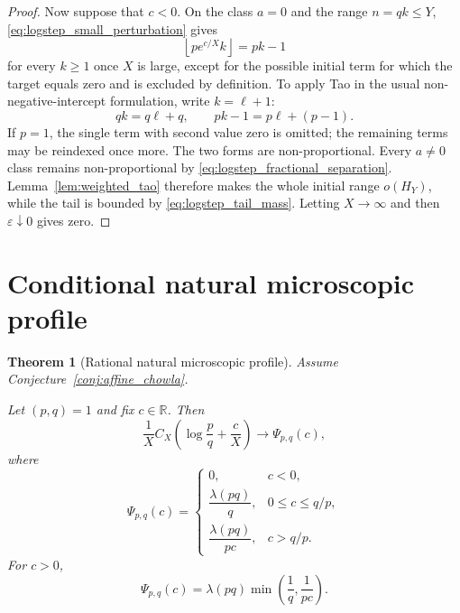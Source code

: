 \documentclass[preprint,12pt]{elsarticle}
\numberwithin{equation}{section}
\theoremstyle{plain}
\newtheorem{theorem}{Theorem}[section]
\theoremstyle{definition}
\theoremstyle{remark}
\begin{document}
\begin{proof}
Now suppose that $c<0$. On the class $a=0$ and the range $n=qk\le Y$,
\eqref{eq:logstep_small_perturbation} gives
\begin{equation}
\left\lfloor pe^{c/X}k\right\rfloor=pk-1
\label{eq:logstep_negative_zero_class}
\end{equation}
for every $k\ge1$ once $X$ is large, except for the possible initial term
for which the target equals zero and is excluded by definition. To apply
Tao in the usual non-negative-intercept formulation, write $k=\ell+1$:
\begin{equation}
qk=q\ell+q,\qquad pk-1=p\ell+(p-1).
\label{eq:logstep_reindex}
\end{equation}
If $p=1$, the single term with second value zero is omitted; the remaining
terms may be reindexed once more. The two forms are non-proportional. Every
$a\ne0$ class remains non-proportional by
\eqref{eq:logstep_fractional_separation}. Lemma~\ref{lem:weighted_tao}
therefore makes the whole initial range $o(H_Y)$, while the tail is bounded
by \eqref{eq:logstep_tail_mass}. Letting $X\to\infty$ and then
$\varepsilon\downarrow0$ gives zero.
\end{proof}

\section{Conditional natural microscopic profile}
\label{sec:natural}

\begin{theorem}[Rational natural microscopic profile]
\label{thm:profile}
Assume Conjecture~\ref{conj:affine_chowla}.\par
Let $(p,q)=1$ and fix $c\in\mathbb R$. Then
\begin{equation}
\frac1X C_X\!\left(\log\frac pq+\frac cX\right)
\longrightarrow
\Psi_{p,q}(c),
\label{eq:profilelimit}
\end{equation}
where
\begin{equation}
\Psi_{p,q}(c)=
\begin{cases}
0,&c<0,\\[1mm]
\dfrac{\lambda(pq)}q,&0\le c\le q/p,\\[3mm]
\dfrac{\lambda(pq)}{pc},&c>q/p.
\end{cases}
\label{eq:profile}
\end{equation}
For $c>0$,
\[
\Psi_{p,q}(c)=
\lambda(pq)\min\!\left(\frac1q,\frac1{pc}\right).
\]
\end{theorem}
\end{document}
